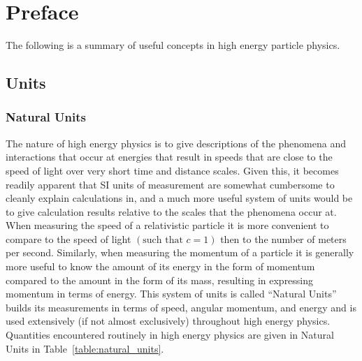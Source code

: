 \chapter*{Preface}\label{chapter:preface}

The following is a summary of useful concepts in high energy particle physics.

\section{Units}\label{section:units}

\subsection{Natural Units}\label{subsection:natural_units}

The nature of high energy physics is to give descriptions of the phenomena and interactions that occur at energies that result in speeds that are close to the speed of light over very short time and distance scales.
Given this, it becomes readily apparent that SI units of measurement are somewhat cumbersome to cleanly explain calculations in, and a much more useful system of units would be to give calculation results relative to the scales that the phenomena occur at.
When measuring the speed of a relativistic particle it is more convenient to compare to the speed of light $\left(\text{such that }c=1\right)$ then to the number of meters per second.
Similarly, when measuring the momentum of a particle it is generally more useful to know the amount of its energy in the form of momentum compared to the amount in the form of its mass, resulting in expressing momentum in terms of energy.
This system of units is called ``Natural Units'' builds its measurements in terms of speed, angular momentum, and energy and is used extensively (if not almost exclusively) throughout high energy physics.
Quantities encountered routinely in high energy physics are given in Natural Units in Table~\ref{table:natural_units}.

